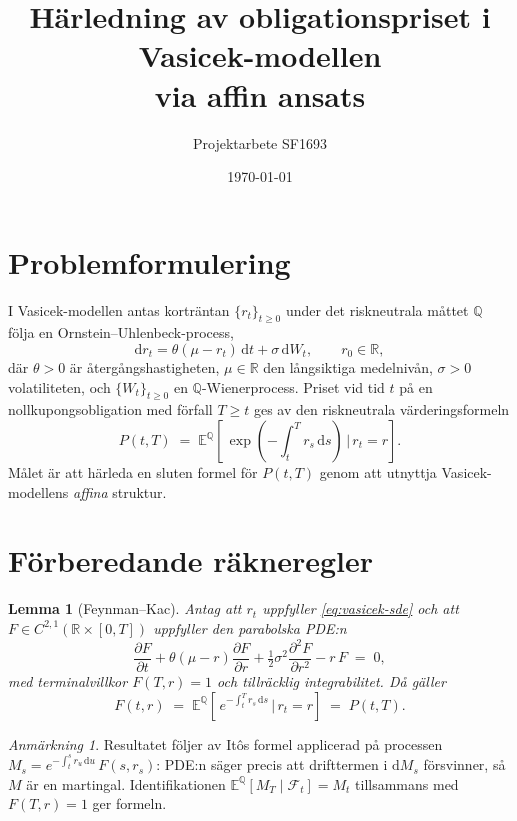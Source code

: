 \documentclass[11pt,a4paper]{article}
\title{Härledning av obligationspriset i Vasicek-modellen \\ via affin ansats}
\author{Projektarbete SF1693}
\date{\today}
\newcommand{\R}{\mathbb{R}}
\newcommand{\E}{\mathbb{E}}
\newcommand{\dd}{\mathrm{d}}
\theoremstyle{plain}
\newtheorem{lemma}[theorem]{Lemma}
\theoremstyle{definition}
\theoremstyle{remark}
\newtheorem*{remark}{Anmärkning}
\begin{document}
\maketitle

\section{Problemformulering}

I Vasicek-modellen \cite{Vasicek1977} antas korträntan $\{r_t\}_{t\geq 0}$ under det riskneutrala måttet $\mathbb{Q}$ följa en Ornstein--Uhlenbeck-process,
\begin{equation}
    \dd r_t = \theta(\mu - r_t)\,\dd t + \sigma\,\dd W_t, \qquad r_0 \in \R,
    \label{eq:vasicek-sde}
\end{equation}
där $\theta>0$ är återgångshastigheten, $\mu\in\R$ den långsiktiga medelnivån, $\sigma>0$ volatiliteten, och $\{W_t\}_{t\geq0}$ en $\mathbb{Q}$-Wienerprocess. Priset vid tid $t$ på en nollkupongsobligation med förfall $T\geq t$ ges av den riskneutrala värderingsformeln
\begin{equation}
    P(t,T) \;=\; \E^{\mathbb{Q}}\!\left[\, \exp\!\left(-\!\int_t^T r_s\,\dd s\right) \,\Big|\, r_t = r \right].
    \label{eq:bond-def}
\end{equation}
Målet är att härleda en sluten formel för $P(t,T)$ genom att utnyttja Vasicek-modellens \emph{affina} struktur.

\section{Förberedande räkneregler}

\begin{lemma}[Feynman--Kac]
\label{lem:fk}
Antag att $r_t$ uppfyller \eqref{eq:vasicek-sde} och att $F\in C^{2,1}(\R\times[0,T])$ uppfyller den parabolska PDE:n
\[
    \frac{\partial F}{\partial t} + \theta(\mu - r)\frac{\partial F}{\partial r} + \tfrac12\sigma^2\frac{\partial^2 F}{\partial r^2} - r\,F \;=\; 0,
\]
med terminalvillkor $F(T,r) = 1$ och tillräcklig integrabilitet. Då gäller
\[
    F(t,r) \;=\; \E^{\mathbb{Q}}\!\left[\, e^{-\int_t^T r_s\,\dd s} \,\Big|\, r_t = r \right] \;=\; P(t,T).
\]
\end{lemma}

\begin{remark}
Resultatet följer av Itôs formel applicerad på processen $M_s = e^{-\int_t^s r_u\,\dd u}\,F(s,r_s)$: PDE:n säger precis att drifttermen i $\dd M_s$ försvinner, så $M$ är en martingal. Identifikationen $\E^{\mathbb{Q}}[M_T \mid \mathcal{F}_t] = M_t$ tillsammans med $F(T,r)=1$ ger formeln.
\end{remark}
\end{document}

